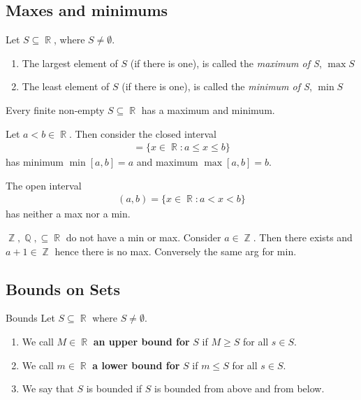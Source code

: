 \documentclass[a4paper, 11pt]{article}
\DeclareMathOperator{\R}{\mathbb{R}}
\DeclareMathOperator{\Q}{\mathbb{Q}}
\DeclareMathOperator*{\Z}{\mathbb{Z}}
\begin{document}
\subsection{Maxes and minimums}
Let $S \subseteq \R$, where $S \neq \emptyset$.

\begin{enumerate}
  \item The largest element of $S$ (if there is one), is called the \textit{maximum of S}, $\max S$
  \item The least element of $S$ (if there is one), is called the \textit{minimum of S}, $\min S$
\end{enumerate}

\begin{example}
Every finite non-empty $S \subseteq \R$ has a maximum and minimum.
\end{example}

\begin{example}
Let $a < b \in \R$. Then consider the closed interval
\begin{align*}
  [a, b] = \lbrace x \in \R: a \leq x \leq b \rbrace
\end{align*}
has minimum $\min [a, b] = a$ and maximum $\max [a, b] = b$.
\end{example}

\begin{example}
The open interval
\begin{align*}
  (a, b) = \lbrace x \in \R: a < x < b \rbrace
\end{align*}
has neither a max nor a min.
\end{example}

\begin{example}
$\Z, \Q, \subseteq \R$ do not have a min or max. Consider $a \in \Z$. Then there exists and $a + 1 \in \Z$ hence there is no max.
Conversely the same arg for min.
\end{example}

\subsection{Bounds on Sets}
\begin{definition}{Bounds}
Let $S \subseteq \R$ where $S \neq \emptyset$.
\begin{enumerate}
  \item We call $M \in \R$ \textbf{an upper bound for} $S$ if $M \geq S$ for all $s \in S$.
  \item We call $m \in \R$ \textbf{a lower bound for} $S$ if $m \leq S$ for all $s \in S$.
  \item We say that $S$ is bounded if $S$ is bounded from above and from below.
\end{enumerate}
\end{definition}
\end{document}
